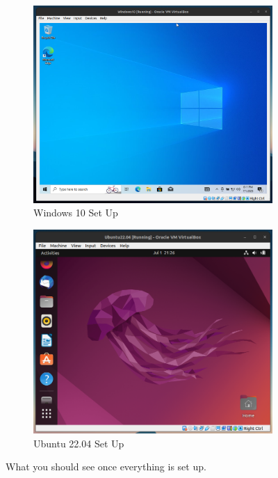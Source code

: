 \documentclass{article}
\begin{document}
  \begin{figure}[hbt!]
      \centering 
      \begin{subfigure}[b]{0.45\textwidth}
      \centering
          \includegraphics[width=\textwidth]{img/VM_Windows3.png}
          \caption{Windows 10 Set Up}
          \label{fig:VM_Windows3}
      \end{subfigure}
      \hfill 
      \begin{subfigure}[b]{0.45\textwidth}
      \centering
          \includegraphics[width=\textwidth]{img/VM_Ubuntu3.png}
          \caption{Ubuntu 22.04 Set Up}
          \label{fig:VM_Ubuntu3}
      \end{subfigure}
      \caption{What you should see once everything is set up. }
  \end{figure}
\end{document}
